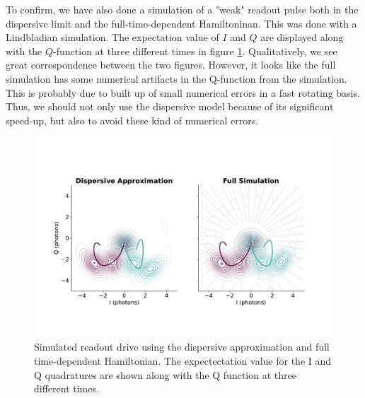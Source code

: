 To confirm, we have also done a simulation of a "weak" readout pulse both in the dispersive limit and the full-time-dependent Hamiltoninan. This was done with a Lindbladian simulation. The expectation value of $I$ and $Q$ are displayed along with the $Q$-function at three different times in figure \ref{fig:dispersive_slash_full_readout}. Qualitatively, we see great correspondence between the two figures. However, it looks like the full simulation has some numerical artifacts in the Q-function from the simulation. This is probably due to built up of small numerical errors in a fast rotating basis. Thus, we should not only use the dispersive model because of its significant speed-up, but also to avoid these kind of numerical errors.

\begin{figure}
    \centering
    \includegraphics[width = \textwidth]{Simulations/readout_simulations/figures/dispersive_approx.pdf}
    \caption{Simulated readout drive using the dispersive approximation and full time-dependent Hamiltonian. The expectectation value for the I and Q quadratures are shown along with the Q function at three different times.}
    \label{fig:dispersive_slash_full_readout}
\end{figure}


